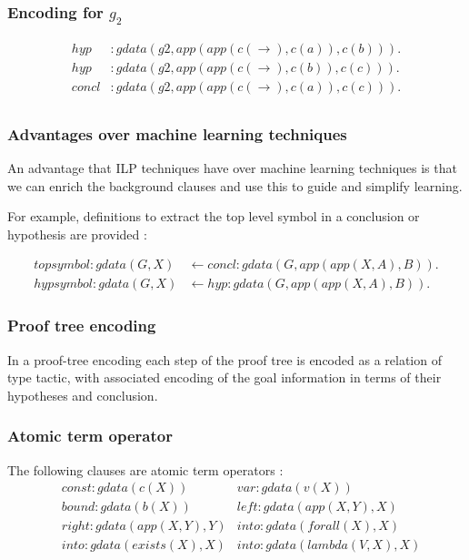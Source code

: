 \documentclass[11pt,handout]{beamer}
\begin{document}
\begin{frame}
  \frametitle{Encoding for $g_2$}

  \begin{align*}
    hyp &: gdata(g2, app(app(c(\to), c(a)), c(b))).  \\
    hyp &: gdata(g2, app(app(c(\to), c(b)), c(c))).  \\
    concl &: gdata(g2, app(app(c(\to), c(a)), c(c))).\\
  \end{align*}
\end{frame}

\begin{frame}
  \frametitle{Advantages over machine learning techniques}
  An advantage that ILP techniques have over machine learning techniques is that
  we can enrich the background clauses and use this to guide and simplify
  learning.


  \vspace*{1cm}

  For example, definitions to extract the top level symbol in a
  conclusion or hypothesis are provided :

  \begin{align*}
    topsymbol : gdata(G,X) & \leftarrow concl : gdata(G, app(app(X, A), B)).\\
    hypsymbol : gdata(G,X) & \leftarrow hyp : gdata(G, app(app(X, A), B)).
  \end{align*}
\end{frame}

\begin{frame}
  \frametitle{Proof tree encoding}
  \begin{tcolorbox}[colback=blue!5!white,colframe=orange!85!white]
    In a proof-tree encoding each step of the proof tree is encoded as a
    relation of type tactic, with associated encoding of the goal information in
    terms of their hypotheses and conclusion.
  \end{tcolorbox}
\end{frame}

\begin{frame}
  \frametitle{Atomic term operator}
  \begin{tcolorbox}[colback=blue!5!white,colframe=orange!85!white]
    The following clauses are atomic term operators :
    \begin{align*}
      &const : gdata(c(X)) &  var : gdata(v(X)) \\
      &bound : gdata(b(X)) & left : gdata(app(X, Y),X) \\
      &right : gdata(app(X, Y), Y) & into : gdata(forall(X),X) \\
      &into : gdata(exists(X),X) & into : gdata(lambda(V,X),X)
    \end{align*}
  \end{tcolorbox}
\end{frame}
\end{document}

